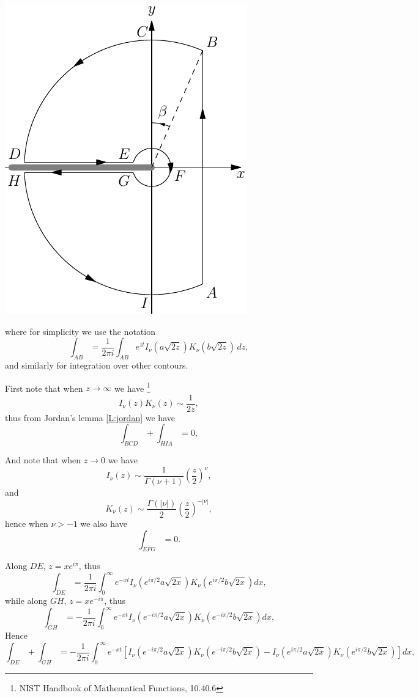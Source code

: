 \begin{marginfigure} \label{F:cont3}
  \includegraphics{graphics/contour.pdf}
\end{marginfigure}

where for simplicity we use the notation
\[
   \int_{AB} = \frac{1}{2\pi i} 
      \int_{AB} e^{zt} I_{\nu}(a\sqrt{2z}) K_{\nu}(b\sqrt{2z})\, dz,
\]
and similarly for integration over other contours. 

First note that when $z\to\infty$ we have
\footnote{NIST Handbook of Mathematical Functions, 10.40.6 }
\[
  I_{\nu}(z) K_{\nu}(z) \sim \frac{1}{2z},
\]
thus from Jordan's lemma \ref{L:jordan} we have 
\[
  \int_{BCD}  + \int_{HIA} = 0,
\]

And note that when $z\to 0$ we have 
\[
  I_{\nu}(z) \sim \frac{1}{\Gamma(\nu+1)} \left( \frac{z}{2} \right)^{\nu},
\]
and
\[
  K_{\nu}(z) \sim \frac{\Gamma(|\nu|)}{2} \left( \frac{z}{2} \right)^{-|\nu|},
\]
hence when $\nu>-1$ we also have
\[
  \int_{EFG} = 0.
\]

Along $DE$, $z=x e^{i\pi}$, thus
\[
  \int_{DE} = \frac{1}{2\pi i} \int_0^{\infty} e^{-xt} 
    I_{\nu}(e^{i\pi/2} a\sqrt{2x}) K_{\nu}(e^{i\pi/2} b\sqrt{2x}) dx,
\]
while along $GH$, $z=x e^{-i\pi}$, thus
\[
  \int_{GH} = - \frac{1}{2\pi i} \int_0^{\infty} e^{-xt} 
    I_{\nu}(e^{-i\pi/2} a\sqrt{2x}) K_{\nu}(e^{-i\pi/2} b\sqrt{2x}) dx,
\]
Hence
\[
  \int_{DE} + \int_{GH} = - \frac{1}{2\pi i} 
    \int_0^{\infty} e^{-xt} 
    [ I_{\nu}(e^{-i\pi/2} a\sqrt{2x}) K_{\nu}(e^{-i\pi/2} b\sqrt{2x}) 
     - I_{\nu}(e^{i\pi/2} a\sqrt{2x}) K_{\nu}(e^{i\pi/2} b\sqrt{2x}) ] dx,
\]


